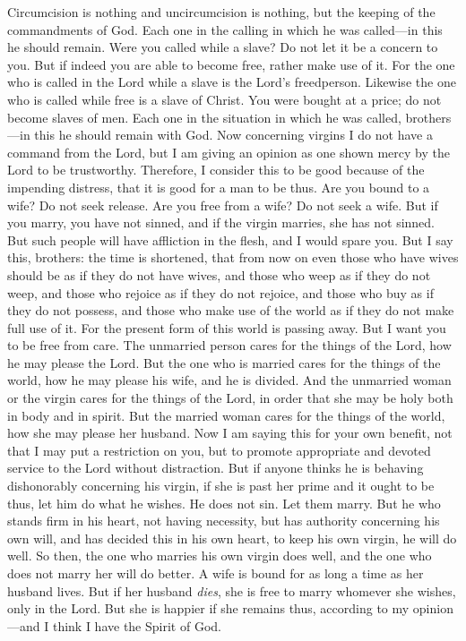\begin{biblechapter}
\verse Circumcision is nothing and uncircumcision is nothing, but the keeping of the commandments of God.
\verse Each one in the calling in which he was called—in this he should remain.
\verse Were you called while a slave? Do not let it be a concern to you. But if indeed you are able to become free, rather make use of it.
\verse For the one who is called in the Lord while a slave is the Lord’s freedperson. Likewise the one who is called while free is a slave of Christ.
\verse You were bought at a price; do not become slaves of men.
\verse Each one in the situation in which he was called, brothers—in this he should remain with God.
 Now concerning virgins I do not have a command from the Lord, but I am giving an opinion as one shown mercy by the Lord to be trustworthy.
\verse Therefore, I consider this to be good because of the impending distress, that it is good for a man to be thus.
\verse Are you bound to a wife? Do not seek release. Are you free from a wife? Do not seek a wife.
\verse But if you marry, you have not sinned, and if the virgin marries, she has not sinned. But such people will have affliction in the flesh, and I would spare you.
\verse But I say this, brothers: the time is shortened, that from now on even those who have wives should be as if they do not have wives,
\verse and those who weep as if they do not weep, and those who rejoice as if they do not rejoice, and those who buy as if they do not possess,
\verse and those who make use of the world as if they do not make full use of it. For the present form of this world is passing away.
\verse But I want you to be free from care. The unmarried person cares for the things of the Lord, how he may please the Lord.
\verse But the one who is married cares for the things of the world, how he may please his wife,
\verse and he is divided. And the unmarried woman or the virgin cares for the things of the Lord, in order that she may be holy both in body and in spirit. But the married woman cares for the things of the world, how she may please her husband.
\verse Now I am saying this for your own benefit, not that I may put a restriction on you, but to promote appropriate and devoted service to the Lord without distraction.
\verse But if anyone thinks he is behaving dishonorably concerning his virgin, if she is past her prime and it ought to be thus, let him do what he wishes. He does not sin. Let them marry.
\verse But he who stands firm in his heart, not having necessity, but has authority concerning his own will, and has decided this in his own heart, to keep his own virgin, he will do well.
\verse So then, the one who marries his own virgin does well, and the one who does not marry her will do better.
\verse A wife is bound for as long a time as her husband lives. But if her husband \textit{dies}, she is free to marry whomever she wishes, only in the Lord.
\verse But she is happier if she remains thus, according to my opinion—and I think I have the Spirit of God.
\end{biblechapter}

